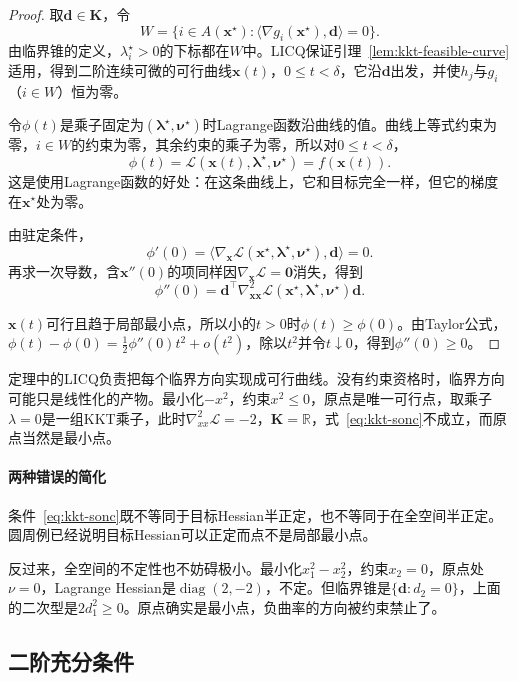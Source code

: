 \begin{proof}
取$\bm{d}\in\bm{K}$，令
\[
 W=\{i\in A(\bm{x}^\star):\langle\nabla g_i(\bm{x}^\star),\bm{d}\rangle=0\}.
\]
由临界锥的定义，$\lambda_i^\star>0$的下标都在$W$中。LICQ保证引理~\ref{lem:kkt-feasible-curve}适用，得到二阶连续可微的可行曲线$\bm{x}(t)$，$0\leq t<\delta$，它沿$\bm{d}$出发，并使$h_j$与$g_i$（$i\in W$）恒为零。

令$\phi(t)$是乘子固定为$(\bm{\lambda}^\star,\bm{\nu}^\star)$时Lagrange函数沿曲线的值。曲线上等式约束为零，$i\in W$的约束为零，其余约束的乘子为零，所以对$0\leq t<\delta$，
\[
 \phi(t)=\mathcal{L}(\bm{x}(t),\bm{\lambda}^\star,\bm{\nu}^\star)=f(\bm{x}(t)).
\]
这是使用Lagrange函数的好处：在这条曲线上，它和目标完全一样，但它的梯度在$\bm{x}^\star$处为零。

由驻定条件，
\[
 \phi'(0)=\langle\nabla_{\bm{x}}\mathcal{L}(\bm{x}^\star,\bm{\lambda}^\star,\bm{\nu}^\star),\bm{d}\rangle=0.
\]
再求一次导数，含$\bm{x}''(0)$的项同样因$\nabla_{\bm{x}}\mathcal{L}=\bm{0}$消失，得到
\[
 \phi''(0)=\bm{d}^\top\nabla^2_{\bm{x}\bm{x}}\mathcal{L}(\bm{x}^\star,\bm{\lambda}^\star,\bm{\nu}^\star)\bm{d}.
\]

$\bm{x}(t)$可行且趋于局部最小点，所以小的$t>0$时$\phi(t)\geq\phi(0)$。由Taylor公式，$\phi(t)-\phi(0)=\frac12\phi''(0)t^2+o(t^2)$，除以$t^2$并令$t\downarrow0$，得到$\phi''(0)\geq0$。
\end{proof}

定理中的LICQ负责把每个临界方向实现成可行曲线。没有约束资格时，临界方向可能只是线性化的产物。最小化$-x^2$，约束$x^2\leq0$，原点是唯一可行点，取乘子$\lambda=0$是一组KKT乘子，此时$\nabla^2_{xx}\mathcal{L}=-2$，$\bm{K}=\mathbb{R}$，式~\eqref{eq:kkt-sonc}不成立，而原点当然是最小点。

\paragraph{两种错误的简化}
条件~\eqref{eq:kkt-sonc}既不等同于目标Hessian半正定，也不等同于在全空间半正定。圆周例已经说明目标Hessian可以正定而点不是局部最小点。

反过来，全空间的不定性也不妨碍极小。最小化$x_1^2-x_2^2$，约束$x_2=0$，原点处$\nu=0$，Lagrange Hessian是$\operatorname{diag}(2,-2)$，不定。但临界锥是$\{\bm{d}:d_2=0\}$，上面的二次型是$2d_1^2\geq0$。原点确实是最小点，负曲率的方向被约束禁止了。

\subsection{二阶充分条件}
\label{sec:kkt-sosc}

